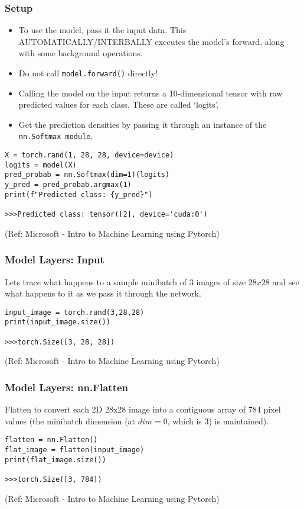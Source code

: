 \begin{frame}[fragile] \frametitle{Setup}

\begin{itemize}
\item To use the model, pass it the input data. This AUTOMATICALLY/INTERBALLY executes the model's forward, along with some background operations. 
\item Do not call \lstinline|model.forward()| directly!
\item Calling the model on the input returns a 10-dimensional tensor with raw predicted values for each class. These are called `logits'.
\item Get the prediction densities by passing it through an instance of the \lstinline|nn.Softmax module|.
\end{itemize}

\begin{lstlisting}
X = torch.rand(1, 28, 28, device=device)
logits = model(X) 
pred_probab = nn.Softmax(dim=1)(logits)
y_pred = pred_probab.argmax(1)
print(f"Predicted class: {y_pred}")

>>>Predicted class: tensor([2], device='cuda:0')
\end{lstlisting}

\tiny{(Ref: Microsoft - Intro to Machine Learning using Pytorch)}
\end{frame}

\begin{frame}[fragile] \frametitle{Model Layers: Input}

Lets trace what happens to a sample minibatch of 3 images of size $28x28$ and see what happens to it as we pass it through the network.

\begin{lstlisting}
input_image = torch.rand(3,28,28)
print(input_image.size())

>>>torch.Size([3, 28, 28])
\end{lstlisting}

\tiny{(Ref: Microsoft - Intro to Machine Learning using Pytorch)}
\end{frame}

\begin{frame}[fragile] \frametitle{Model Layers: nn.Flatten}

Flatten to convert each 2D 28x28 image into a contiguous array of 784 pixel values (the minibatch dimension (at $dim=0$, which is 3) is maintained).

\begin{lstlisting}
flatten = nn.Flatten()
flat_image = flatten(input_image)
print(flat_image.size())

>>>torch.Size([3, 784])
\end{lstlisting}

\tiny{(Ref: Microsoft - Intro to Machine Learning using Pytorch)}
\end{frame}

